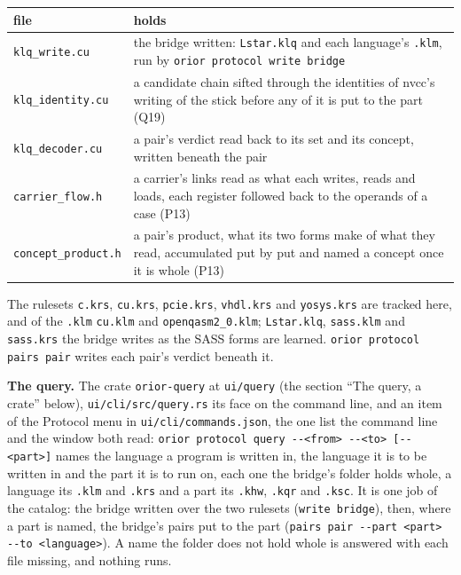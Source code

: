 {\small
\setlength{\tabcolsep}{6pt}
\begin{longtable}{>{\RaggedRight\arraybackslash}p{}>{\RaggedRight\arraybackslash}p{}}
\toprule
file & holds \\
\midrule
\endhead
\texttt{klq\_\allowbreak{}write.\allowbreak{}cu} & the bridge written: \texttt{Lstar.\allowbreak{}klq} and each language's \texttt{.\allowbreak{}klm}, run by \texttt{orior protocol write bridge} \\
\texttt{klq\_\allowbreak{}identity.\allowbreak{}cu} & a candidate chain sifted through the identities of nvcc's writing of the stick before any of it is put to the part (Q19) \\
\texttt{klq\_\allowbreak{}decoder.\allowbreak{}cu} & a pair's verdict read back to its set and its concept, written beneath the pair \\
\texttt{carrier\_\allowbreak{}flow.\allowbreak{}h} & a carrier's links read as what each writes, reads and loads, each register followed back to the operands of a case (P13) \\
\texttt{concept\_\allowbreak{}product.\allowbreak{}h} & a pair's product, what its two forms make of what they read, accumulated put by put and named a concept once it is whole (P13) \\
\bottomrule
\end{longtable}
}

The rulesets \texttt{c.\allowbreak{}krs}, \texttt{cu.\allowbreak{}krs}, \texttt{pcie.\allowbreak{}krs}, \texttt{vhdl.\allowbreak{}krs} and \texttt{yosys.\allowbreak{}krs} are tracked here, and of the \texttt{.\allowbreak{}klm} \texttt{cu.\allowbreak{}klm} and \texttt{openqasm2\_\allowbreak{}0.\allowbreak{}klm}; \texttt{Lstar.\allowbreak{}klq}, \texttt{sass.\allowbreak{}klm} and \texttt{sass.\allowbreak{}krs} the bridge writes as the SASS forms are learned. \texttt{orior protocol pairs pair} writes each pair's verdict beneath it.

\textbf{The query.} The crate \texttt{orior-\allowbreak{}query} at \texttt{ui/\allowbreak{}query} (the section “The query, a crate” below), \texttt{ui/\allowbreak{}cli/\allowbreak{}src/\allowbreak{}query.\allowbreak{}rs} its face on the command line, and an item of the Protocol menu in \texttt{ui/\allowbreak{}cli/\allowbreak{}commands.\allowbreak{}json}, the one list the command line and the window both read: \texttt{orior protocol query -\allowbreak{}-\allowbreak{}<from> -\allowbreak{}-\allowbreak{}<to> [-\allowbreak{}-\allowbreak{}<part>]} names the language a program is written in, the language it is to be written in and the part it is to run on, each one the bridge's folder holds whole, a language its \texttt{.\allowbreak{}klm} and \texttt{.\allowbreak{}krs} and a part its \texttt{.\allowbreak{}khw}, \texttt{.\allowbreak{}kqr} and \texttt{.\allowbreak{}ksc}. It is one job of the catalog: the bridge written over the two rulesets (\texttt{write bridge}), then, where a part is named, the bridge's pairs put to the part (\texttt{pairs pair -\allowbreak{}-\allowbreak{}part <part> -\allowbreak{}-\allowbreak{}to <language>}). A name the folder does not hold whole is answered with each file missing, and nothing runs.

